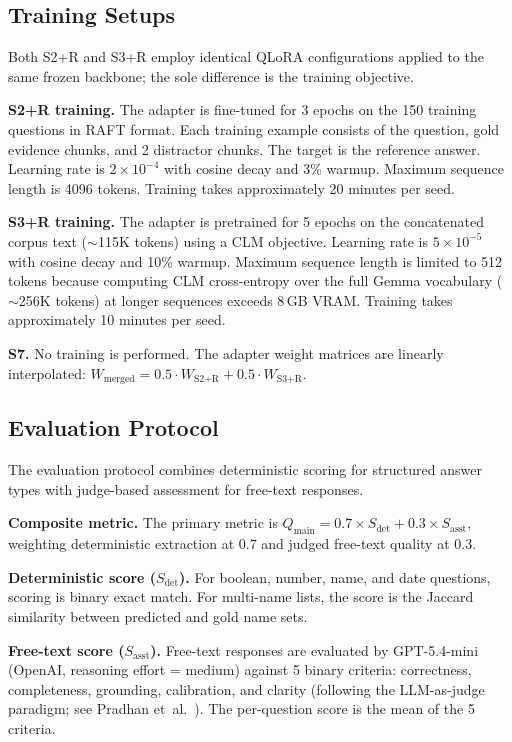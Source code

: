 \subsection{Training Setups}

Both S2+R and S3+R employ identical QLoRA configurations applied to the same frozen backbone; the sole difference is the training objective.

\textbf{S2+R training.} The adapter is fine-tuned for 3 epochs on the 150 training questions in RAFT format. Each training example consists of the question, gold evidence chunks, and 2 distractor chunks. The target is the reference answer. Learning rate is $2 \times 10^{-4}$ with cosine decay and 3\% warmup. Maximum sequence length is 4096 tokens. Training takes approximately 20 minutes per seed.

\textbf{S3+R training.} The adapter is pretrained for 5 epochs on the concatenated corpus text ($\sim$115K tokens) using a CLM objective. Learning rate is $5 \times 10^{-5}$ with cosine decay and 10\% warmup. Maximum sequence length is limited to 512 tokens because computing CLM cross-entropy over the full Gemma vocabulary ($\sim$256K tokens) at longer sequences exceeds 8\,GB VRAM. Training takes approximately 10 minutes per seed.

\textbf{S7.} No training is performed. The adapter weight matrices are linearly interpolated: $W_{\text{merged}} = 0.5 \cdot W_{\text{S2+R}} + 0.5 \cdot W_{\text{S3+R}}$.

\subsection{Evaluation Protocol}

The evaluation protocol combines deterministic scoring for structured answer types with judge-based assessment for free-text responses.

\textbf{Composite metric.} The primary metric is $Q_{\text{main}} = 0.7 \times S_{\text{det}} + 0.3 \times S_{\text{asst}}$, weighting deterministic extraction at 0.7 and judged free-text quality at 0.3.

\textbf{Deterministic score ($S_{\text{det}}$).} For boolean, number, name, and date questions, scoring is binary exact match. For multi-name lists, the score is the Jaccard similarity between predicted and gold name sets.

\textbf{Free-text score ($S_{\text{asst}}$).} Free-text responses are evaluated by GPT-5.4-mini (OpenAI, reasoning effort = medium) against 5 binary criteria: correctness, completeness, grounding, calibration, and clarity (following the LLM-as-judge paradigm; see Pradhan et~al.~\cite{pradhan2025llmjudge}). The per-question score is the mean of the 5 criteria.

